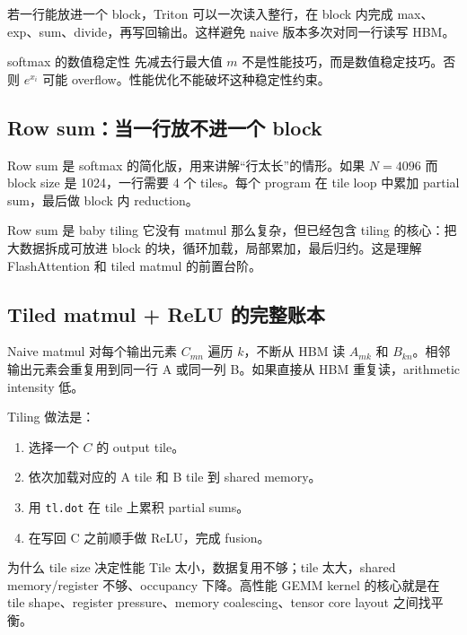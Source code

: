 \documentclass[a4paper]{article}
\begin{document}
若一行能放进一个 block，Triton 可以一次读入整行，在 block 内完成 max、exp、sum、divide，再写回输出。这样避免 naive 版本多次对同一行读写 HBM。

\begin{warningbox}{softmax 的数值稳定性}
先减去行最大值 \(m\) 不是性能技巧，而是数值稳定技巧。否则 \(e^{x_i}\) 可能 overflow。性能优化不能破坏这种稳定性约束。
\end{warningbox}

\subsection{Row sum：当一行放不进一个 block}

Row sum 是 softmax 的简化版，用来讲解“行太长”的情形。如果 \(N=4096\) 而 block size 是 1024，一行需要 4 个 tiles。每个 program 在 tile loop 中累加 partial sum，最后做 block 内 reduction。

\begin{importantbox}{Row sum 是 baby tiling}
它没有 matmul 那么复杂，但已经包含 tiling 的核心：把大数据拆成可放进 block 的块，循环加载，局部累加，最后归约。这是理解 FlashAttention 和 tiled matmul 的前置台阶。
\end{importantbox}

\subsection{Tiled matmul + ReLU 的完整账本}

Naive matmul 对每个输出元素 \(C_{mn}\) 遍历 \(k\)，不断从 HBM 读 \(A_{mk}\) 和 \(B_{kn}\)。相邻输出元素会重复用到同一行 A 或同一列 B。如果直接从 HBM 重复读，arithmetic intensity 低。

Tiling 做法是：

\begin{enumerate}
    \item 选择一个 \(C\) 的 output tile。
    \item 依次加载对应的 A tile 和 B tile 到 shared memory。
    \item 用 \texttt{tl.dot} 在 tile 上累积 partial sums。
    \item 在写回 C 之前顺手做 ReLU，完成 fusion。
\end{enumerate}

\begin{knowledgebox}{为什么 tile size 决定性能}
Tile 太小，数据复用不够；tile 太大，shared memory/register 不够、occupancy 下降。高性能 GEMM kernel 的核心就是在 tile shape、register pressure、memory coalescing、tensor core layout 之间找平衡。
\end{knowledgebox}
\end{document}
